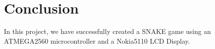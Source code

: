 \section{Conclusion}
In this project, we have successfully created a SNAKE game using an ATMEGA2560 microcontroller and a Nokia5110 LCD Display.